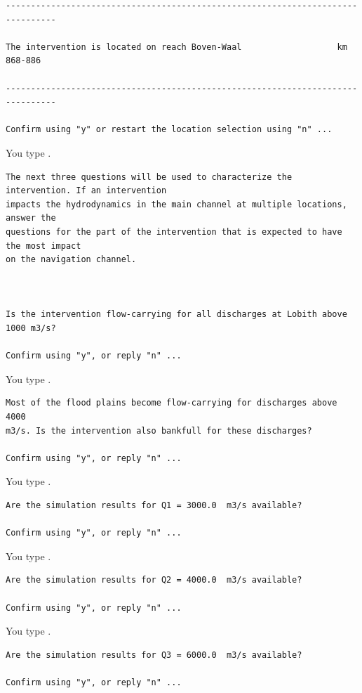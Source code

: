 \begin{Verbatim}
--------------------------------------------------------------------------------

The intervention is located on reach Boven-Waal                   km  868-886

--------------------------------------------------------------------------------

Confirm using "y" or restart the location selection using "n" ...
\end{Verbatim}

You type .

\begin{Verbatim}
The next three questions will be used to characterize the intervention. If an intervention
impacts the hydrodynamics in the main channel at multiple locations, answer the
questions for the part of the intervention that is expected to have the most impact
on the navigation channel.



Is the intervention flow-carrying for all discharges at Lobith above 1000 m3/s?

Confirm using "y", or reply "n" ...
\end{Verbatim}

You type .

\begin{Verbatim}
Most of the flood plains become flow-carrying for discharges above 4000
m3/s. Is the intervention also bankfull for these discharges?

Confirm using "y", or reply "n" ...
\end{Verbatim}

You type .

\begin{Verbatim}
Are the simulation results for Q1 = 3000.0  m3/s available?

Confirm using "y", or reply "n" ...
\end{Verbatim}

You type .

\begin{Verbatim}
Are the simulation results for Q2 = 4000.0  m3/s available?

Confirm using "y", or reply "n" ...
\end{Verbatim}

You type .

\begin{Verbatim}
Are the simulation results for Q3 = 6000.0  m3/s available?

Confirm using "y", or reply "n" ...
\end{Verbatim}

